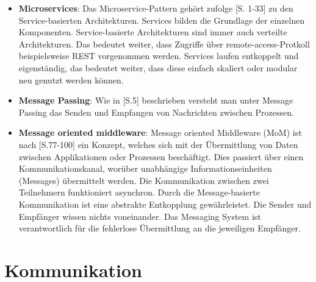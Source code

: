 \begin{itemize}
    \item \textbf{Microservices}: Das Microservice-Pattern gehört zufolge  \cite{microservices}[S. 1-33] zu den Service-basierten Architekturen. Services bilden die Grundlage der einzelnen Komponenten. Service-basierte Architekturen sind immer auch verteilte Architekturen. Das bedeutet weiter, dass Zugriffe über remote-access-Protkoll beispielsweise REST vorgenommen werden. Services laufen entkoppelt und eigenständig, das bedeutet weiter, dass diese einfach skaliert oder modular neu genutzt werden können.
    \item \textbf{Message Passing}: Wie in \cite{message-passing}[S.5] beschrieben versteht man unter Message Passing das Senden und Empfangen von Nachrichten zwischen Prozessen.
    \item \textbf{Message oriented middleware}: Message oriented Middleware (MoM) ist nach \cite{mim}[S.77-100] ein Konzept, welches sich mit der Übermittlung von Daten zwischen Applikationen oder Prozessen beschäftigt. Dies passiert über einen Kommunikationskanal, worüber unabhängige Informationseinheiten (Messages) üb\-er\-mit\-telt werden. Die Kommunikation zwischen zwei Teilnehmern funktioniert asynchron. Durch die Message-basierte Kommunikation ist eine abstrakte Entkopplung gewährleistet. Die Sender und Empfänger wissen nichts voneinander. Das Messaging System ist verantwortlich für die fehlerlose Übermittlung an die jeweiligen Empfänger.
    
\end{itemize}



\section{Kommunikation}\label{literatur-kommunikation}

